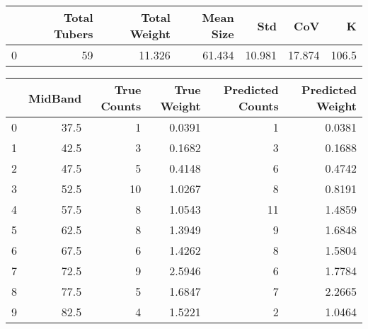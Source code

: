 \begin{tabular}{lrrrrrr}
\toprule
{} &  Total Tubers &  Total Weight &  Mean Size &     Std &     CoV &      K \\
\midrule
0 &            59 &        11.326 &     61.434 &  10.981 &  17.874 &  106.5 \\
\bottomrule
\end{tabular}

\begin{tabular}{lrrrrr}
\toprule
{} &  MidBand &  True Counts &  True Weight &  Predicted Counts &  Predicted Weight \\
\midrule
0 &     37.5 &            1 &       0.0391 &                 1 &            0.0381 \\
1 &     42.5 &            3 &       0.1682 &                 3 &            0.1688 \\
2 &     47.5 &            5 &       0.4148 &                 6 &            0.4742 \\
3 &     52.5 &           10 &       1.0267 &                 8 &            0.8191 \\
4 &     57.5 &            8 &       1.0543 &                11 &            1.4859 \\
5 &     62.5 &            8 &       1.3949 &                 9 &            1.6848 \\
6 &     67.5 &            6 &       1.4262 &                 8 &            1.5804 \\
7 &     72.5 &            9 &       2.5946 &                 6 &            1.7784 \\
8 &     77.5 &            5 &       1.6847 &                 7 &            2.2665 \\
9 &     82.5 &            4 &       1.5221 &                 2 &            1.0464 \\
\bottomrule
\end{tabular}

